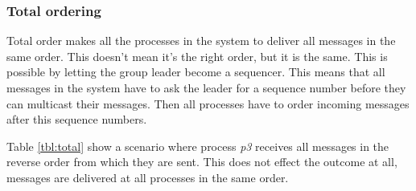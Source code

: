 \documentclass[titlepage, twocolumn, a4paper, 10pt]{article}
\begin{document}
\subsubsection{Total ordering}\label{sec:total}
Total order makes all the processes in the system to deliver all messages
in the same order. This doesn't mean it's the right order, but it is the same.
This is possible by letting the group leader become a sequencer. This means
that all messages in the system have to ask the leader for a sequence number
before they can multicast their messages. Then all processes have to order
incoming messages after this sequence numbers.

Table \ref{tbl:total} show a scenario where process \textit{p3}
receives all messages in the reverse order from which they are sent.
This does not effect the outcome at all, messages are delivered at all
processes in the same order.
\end{document}

